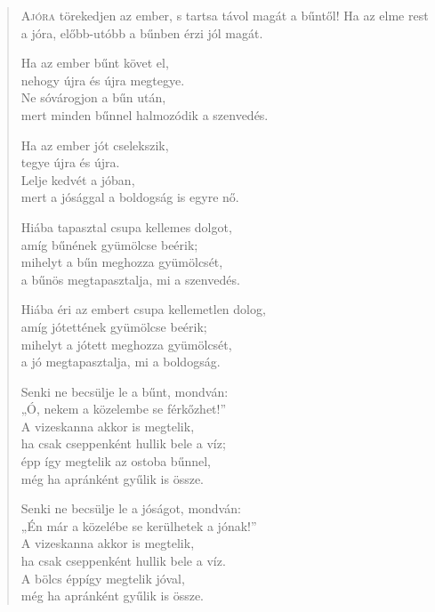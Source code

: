 
\begin{verse}

{\par%
\lettrine[slope=0.5em]{A}{jóra} {\LettrineTextFont törekedjen az ember,}\newline
s tartsa távol magát a bűntől!\newline
Ha az elme rest a jóra,\verselinebreak
előbb-utóbb a bűnben érzi jól magát.
\par}

 Ha az ember bűnt követ el,\\
nehogy újra és újra megtegye.\\
Ne sóvárogjon a bűn után,\\
mert minden bűnnel halmozódik a szenvedés.

 Ha az ember jót cselekszik,\\
tegye újra és újra.\\
Lelje kedvét a jóban,\\
mert a jósággal a boldogság is egyre nő.

 Hiába tapasztal csupa kellemes dolgot,\\
amíg bűnének gyümölcse beérik;\\
mihelyt a bűn meghozza gyümölcsét,\\
a bűnös megtapasztalja, mi a szenvedés.

 Hiába éri az embert csupa kellemetlen dolog,\\
amíg jótettének gyümölcse beérik;\\
mihelyt a jótett meghozza gyümölcsét,\\
a jó megtapasztalja, mi a boldogság.

 Senki ne becsülje le a bűnt, mondván:\\
„Ó, nekem a közelembe se férkőzhet!”\\
A vizeskanna akkor is megtelik,\\
ha csak cseppenként hullik bele a víz;\\
épp így megtelik az ostoba bűnnel,\\
még ha apránként gyűlik is össze.

 Senki ne becsülje le a jóságot, mondván:\\
„Én már a közelébe se kerülhetek a jónak!”\\
A vizeskanna akkor is megtelik,\\
ha csak cseppenként hullik bele a víz.\\
A bölcs éppígy megtelik jóval,\\
még ha apránként gyűlik is össze.


\end{verse}
